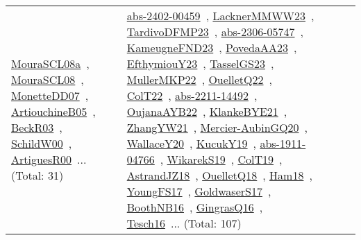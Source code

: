 {\begin{longtable}{lp{3cm}>{\raggedright\arraybackslash}p{6cm}>{\raggedright\arraybackslash}p{6cm}>{\raggedright\arraybackslash}p{8cm}}
\href{works/MouraSCL08a.pdf}{MouraSCL08a}~\cite{MouraSCL08a}, \href{works/MouraSCL08.pdf}{MouraSCL08}~\cite{MouraSCL08}, \href{works/MonetteDD07.pdf}{MonetteDD07}~\cite{MonetteDD07}, \href{works/ArtiouchineB05.pdf}{ArtiouchineB05}~\cite{ArtiouchineB05}, \href{works/BeckR03.pdf}{BeckR03}~\cite{BeckR03}, \href{works/SchildW00.pdf}{SchildW00}~\cite{SchildW00}, \href{works/ArtiguesR00.pdf}{ArtiguesR00}~\cite{ArtiguesR00}... (Total: 31) & \href{works/abs-2402-00459.pdf}{abs-2402-00459}~\cite{abs-2402-00459}, \href{works/LacknerMMWW23.pdf}{LacknerMMWW23}~\cite{LacknerMMWW23}, \href{works/TardivoDFMP23.pdf}{TardivoDFMP23}~\cite{TardivoDFMP23}, \href{works/abs-2306-05747.pdf}{abs-2306-05747}~\cite{abs-2306-05747}, \href{works/KameugneFND23.pdf}{KameugneFND23}~\cite{KameugneFND23}, \href{works/PovedaAA23.pdf}{PovedaAA23}~\cite{PovedaAA23}, \href{works/EfthymiouY23.pdf}{EfthymiouY23}~\cite{EfthymiouY23}, \href{works/TasselGS23.pdf}{TasselGS23}~\cite{TasselGS23}, \href{works/MullerMKP22.pdf}{MullerMKP22}~\cite{MullerMKP22}, \href{works/OuelletQ22.pdf}{OuelletQ22}~\cite{OuelletQ22}, \href{works/ColT22.pdf}{ColT22}~\cite{ColT22}, \href{works/abs-2211-14492.pdf}{abs-2211-14492}~\cite{abs-2211-14492}, \href{works/OujanaAYB22.pdf}{OujanaAYB22}~\cite{OujanaAYB22}, \href{works/KlankeBYE21.pdf}{KlankeBYE21}~\cite{KlankeBYE21}, \href{works/ZhangYW21.pdf}{ZhangYW21}~\cite{ZhangYW21}, \href{works/Mercier-AubinGQ20.pdf}{Mercier-AubinGQ20}~\cite{Mercier-AubinGQ20}, \href{works/WallaceY20.pdf}{WallaceY20}~\cite{WallaceY20}, \href{works/KucukY19.pdf}{KucukY19}~\cite{KucukY19}, \href{works/abs-1911-04766.pdf}{abs-1911-04766}~\cite{abs-1911-04766}, \href{works/WikarekS19.pdf}{WikarekS19}~\cite{WikarekS19}, \href{works/ColT19.pdf}{ColT19}~\cite{ColT19}, \href{works/AstrandJZ18.pdf}{AstrandJZ18}~\cite{AstrandJZ18}, \href{works/OuelletQ18.pdf}{OuelletQ18}~\cite{OuelletQ18}, \href{works/Ham18.pdf}{Ham18}~\cite{Ham18}, \href{works/YoungFS17.pdf}{YoungFS17}~\cite{YoungFS17}, \href{works/GoldwaserS17.pdf}{GoldwaserS17}~\cite{GoldwaserS17}, \href{works/BoothNB16.pdf}{BoothNB16}~\cite{BoothNB16}, \href{works/GingrasQ16.pdf}{GingrasQ16}~\cite{GingrasQ16}, \href{works/Tesch16.pdf}{Tesch16}~\cite{Tesch16}... (Total: 107)\\

\end{longtable}}
